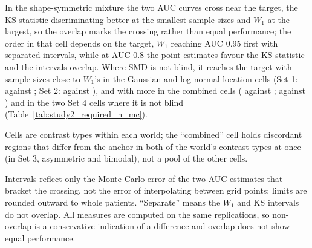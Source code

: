 \documentclass[AMA,Times1COL]{WileyNJDv5}
\begin{document}
In the shape-symmetric mixture the two AUC curves cross near the target, the KS statistic discriminating better at the smallest sample sizes and $W_1$ at the largest, so the overlap marks the crossing rather than equal performance; the order in that cell depends on the target, $W_1$ reaching AUC 0.95 first with separated intervals, while at AUC 0.8 the point estimates favour the KS statistic and the intervals overlap. Where SMD is not blind, it reaches the target with sample sizes close to $W_1$'s in the Gaussian and log-normal location cells (Set 1:  against ; Set 2:  against ), and with more in the combined cells ( against ;  against ) and in the two Set 4 cells where it is not blind (Table~\ref{tab:study2_required_n_mc}).

\begin{table}[ht]
\centering
\caption{Per-region sample size at which selection AUC reaches 0.9, by cell and measure, interpolated on $\log n$ over the grid $n = 25$--2{,}000, with 95\% Monte Carlo intervals from the delta method applied to the log-$n$ interpolation, using the Monte Carlo standard errors of the two AUC estimates that bracket the crossing. Cells whose AUC stays at chance (--) across the full grid are marked ``blind''; $\leq 25$ marks a target reached at the smallest grid size, where no interval is available, and such a cell counts as separated when 25 lies below the other measure's lower limit.\label{tab:study2_required_n_mc}}
\begin{tablenotes}
\item Cells are contrast types within each world; the ``combined'' cell holds discordant regions that differ from the anchor in both of the world's contrast types at once (in Set 3, asymmetric and bimodal), not a pool of the other cells.
\item Intervals reflect only the Monte Carlo error of the two AUC estimates that bracket the crossing, not the error of interpolating between grid points; limits are rounded outward to whole patients. ``Separate'' means the $W_1$ and KS intervals do not overlap. All measures are computed on the same replications, so non-overlap is a conservative indication of a difference and overlap does not show equal performance.
\end{tablenotes}
\end{table}
\end{document}
